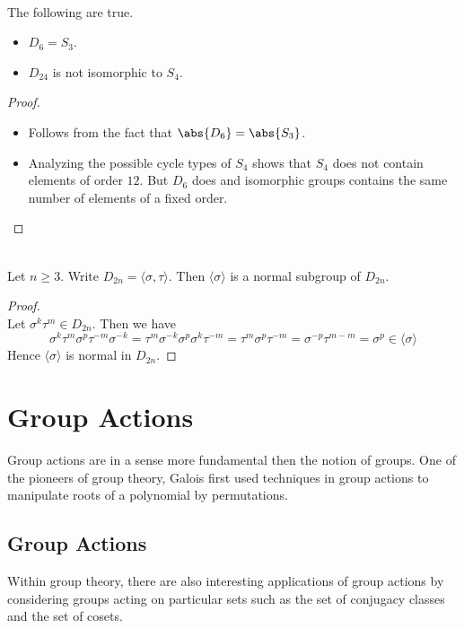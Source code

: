 \documentclass[a4paper]{article}
\begin{document}
\begin{eg}{}{}\\
The following are true. 
\begin{itemize}
\item $D_6=S_3$. 
\item $D_{24}$ is not isomorphic to $S_4$. 
\end{itemize}
\begin{proof}\\
\begin{itemize}
\item Follows from the fact that $\abs{D_6}=\abs{S_3}$. 
\item Analyzing the possible cycle types of $S_4$ shows that $S_4$ does not contain elements of order $12$. But $D_6$ does and isomorphic groups contains the same number of elements of a fixed order. 
\end{itemize}
\end{proof}
\end{eg}

\begin{prp}{}{}\\
Let $n\geq 3$. Write $D_{2n}=\langle\sigma,\tau\rangle$. Then $\langle\sigma\rangle$ is a normal subgroup of $D_{2n}$. 
\begin{proof}\\
Let $\sigma^k\tau^m\in D_{2n}$. Then we have $$\sigma^k\tau^m\sigma^p\tau^{-m}\sigma^{-k}=\tau^m\sigma^{-k}\sigma^p\sigma^k\tau^{-m}=\tau^m\sigma^p\tau^{-m}=\sigma^{-p}\tau^{m-m}=\sigma^p\in\langle\sigma\rangle$$ Hence $\langle\sigma\rangle$ is normal in $D_{2n}$. 
\end{proof}
\end{prp}

\pagebreak
\section{Group Actions}
Group actions are in a sense more fundamental then the notion of groups. One of the pioneers of group theory, Galois first used techniques in group actions to manipulate roots of a polynomial by permutations. 

\subsection{Group Actions}
Within group theory, there are also interesting applications of group actions by considering groups acting on particular sets such as the set of conjugacy classes and the set of cosets. 
\end{document}
